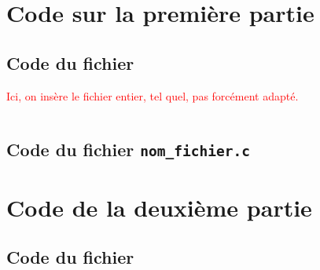 \documentclass[12pt,a4paper,fleqn]{article}
\begin{document}
\pagestyle{fancy} %

\newpage
\section{Code sur la première partie}

\subsection{Code du fichier }
\textcolor{red}{Ici, on insère le fichier entier, tel quel, pas forcément adapté.}
\inputminted{c}{triangle.c}

\subsection{Code du fichier \texorpdfstring{\texttt{nom_fichier.c}}{nom\_fichier.c}}


\newpage
\section{Code de la deuxième partie}

\subsection{Code du fichier }
\inputminted[firstline=1,lastline=20]{c}{triangle.c}
\end{document}
